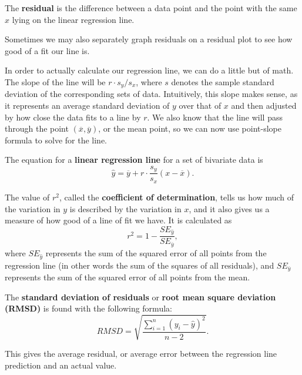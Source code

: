 \begin{blackbox}
    \begin{definition}
        The \textbf{residual} is the difference between a data point and the
        point with the same \( x \) lying on the linear regression line.
    \end{definition}
\end{blackbox}

Sometimes we may also separately graph residuals on a residual plot to see how
good of a fit our line is.

In order to actually calculate our regression line, we can do a little but of
math. The slope of the line will be \( r \cdot s_y / s_x \), where \( s \)
denotes the sample standard deviation of the corresponding sets of data.
Intuitively, this slope makes sense, as it represents an average standard
deviation of \( y \) over that of \( x \) and then adjusted by how close the
data fits to a line by \( r \). We also know that the line will pass through
the point \( \left( \overline{x}, \overline{y} \right) \), or the mean point,
so we can now use point-slope formula to solve for the line. 

\begin{blackbox}
    \begin{definition}
        The equation for a \textbf{linear regression line} for a set of bivariate data is
        \[
            \hat{y} = \overline{y} + r \cdot \frac{s_y}{s_x} \left( x - \overline{x} \right)
        .\]
    \end{definition}
\end{blackbox}

\begin{blackbox}
    \begin{definition}
        The value of \( r^2 \), called the \textbf{coefficient of
        determination}, tells us how much of the variation in \( y \) is
        described by the variation in \( x \), and it also gives us a measure
        of how good of a line of fit we have. It is calculated as
        \[
            r^2 = 1 - \frac{SE_{\hat{y}}}{SE_{\overline{y}}}
        ,\]
        where \( SE_{\hat{y}} \) represents the sum of the squared error of all
        points from the regression line (in other words the sum of the squares
        of all residuals), and \( SE_{\overline{y}} \) represents the sum of
        the squared error of all points from the mean.
    \end{definition}
\end{blackbox}

\begin{blackbox}
    The \textbf{standard deviation of residuals} or \textbf{root mean square deviation (RMSD)} is found with the following formula:
    \[
        RMSD = \sqrt{\frac{\sum_{i = 1}^n \left( y_i - \hat{y} \right)^2}{n - 2}}
    .\]
\end{blackbox}

This gives the average residual, or average error between the regression line
prediction and an actual value.

